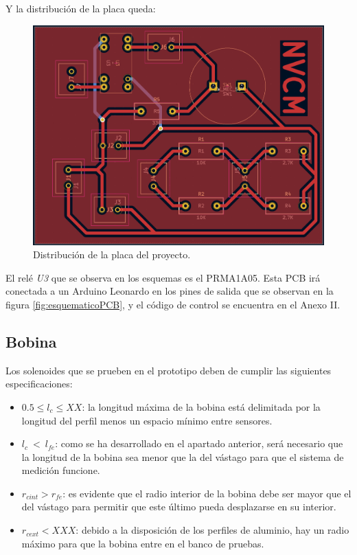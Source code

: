 \noindent Y la distribución de la placa queda:

\begin{figure}[H]
    \centering
    \includegraphics[width=12.5cm]{FigurasMemoria/placaPCB.png}
    \caption{Distribución de la placa del proyecto.}
    \label{fig:placaPCB} %
\end{figure}

El relé \textit{U3} que se observa en los esquemas es el PRMA1A05. Esta PCB irá conectada a un Arduino Leonardo en los pines de salida que se observan en la figura \ref{fig:esquematicoPCB}, y el código de control se encuentra en el Anexo II.

\subsection{Bobina}
\label{subsec:bobina}

Los solenoides que se prueben en el prototipo deben de cumplir las siguientes especificaciones:

\begin{itemize}
    \item \(0.5\leq l_{c} \leq XX\): la longitud máxima de la bobina está delimitada por la longitud del perfil menos un espacio mínimo entre sensores.
    \item \(l_c~<~l_{fe}\): como se ha desarrollado en el apartado anterior, será necesario que la longitud de la bobina sea menor que la del vástago para que el sistema de medición funcione.
    \item \(r_{cint} > r_{fe}\): es evidente que el radio interior de la bobina debe ser mayor que el del vástago para permitir que este último pueda desplazarse en su interior.
    \item \(r_{cext} < XXX\): debido a la disposición de los perfiles de aluminio, hay un radio máximo para que la bobina entre en el banco de pruebas.
\end{itemize}

